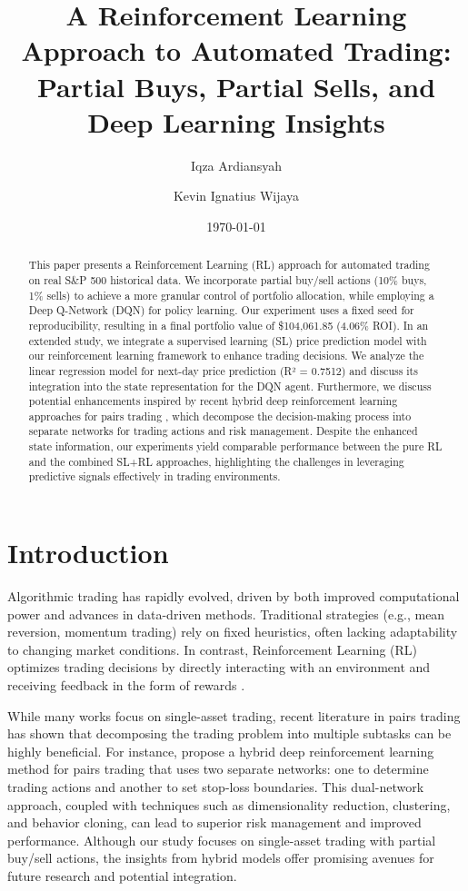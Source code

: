 \documentclass[11pt]{article}
\title{A Reinforcement Learning Approach to Automated Trading: Partial Buys, Partial Sells, and Deep Learning Insights}
\author[1]{Iqza Ardiansyah}
\author[2]{Kevin Ignatius Wijaya}
\affil[1]{Student ID: 2206810042\\ Faculty of Computer Science, Universitas Indonesia}
\affil[2]{Student ID: 2206083470\\ Faculty of Computer Science, Universitas Indonesia}
\date{\today}
\begin{document}
\maketitle

\begin{abstract}
This paper presents a Reinforcement Learning (RL) approach for automated trading on real S\&P 500 historical data. We incorporate partial buy/sell actions (10\% buys, 1\% sells) to achieve a more granular control of portfolio allocation, while employing a Deep Q-Network (DQN) for policy learning. Our experiment uses a fixed seed for reproducibility, resulting in a final portfolio value of \$104,061.85 (4.06\% ROI). In an extended study, we integrate a supervised learning (SL) price prediction model with our reinforcement learning framework to enhance trading decisions. We analyze the linear regression model for next-day price prediction (R² = 0.7512) and discuss its integration into the state representation for the DQN agent. Furthermore, we discuss potential enhancements inspired by recent hybrid deep reinforcement learning approaches for pairs trading \citep{kim2022hybrid}, which decompose the decision-making process into separate networks for trading actions and risk management. Despite the enhanced state information, our experiments yield comparable performance between the pure RL and the combined SL+RL approaches, highlighting the challenges in leveraging predictive signals effectively in trading environments.
\end{abstract}

\section{Introduction}
Algorithmic trading has rapidly evolved, driven by both improved computational power and advances in data-driven methods. Traditional strategies (e.g., mean reversion, momentum trading) rely on fixed heuristics, often lacking adaptability to changing market conditions. In contrast, Reinforcement Learning (RL) optimizes trading decisions by directly interacting with an environment and receiving feedback in the form of rewards \citep{sutton_2018_irl}.

While many works focus on single-asset trading, recent literature in pairs trading has shown that decomposing the trading problem into multiple subtasks can be highly beneficial. For instance, \citep{kim2022hybrid} propose a hybrid deep reinforcement learning method for pairs trading that uses two separate networks: one to determine trading actions and another to set stop-loss boundaries. This dual-network approach, coupled with techniques such as dimensionality reduction, clustering, and behavior cloning, can lead to superior risk management and improved performance. Although our study focuses on single-asset trading with partial buy/sell actions, the insights from hybrid models offer promising avenues for future research and potential integration.
\end{document}
